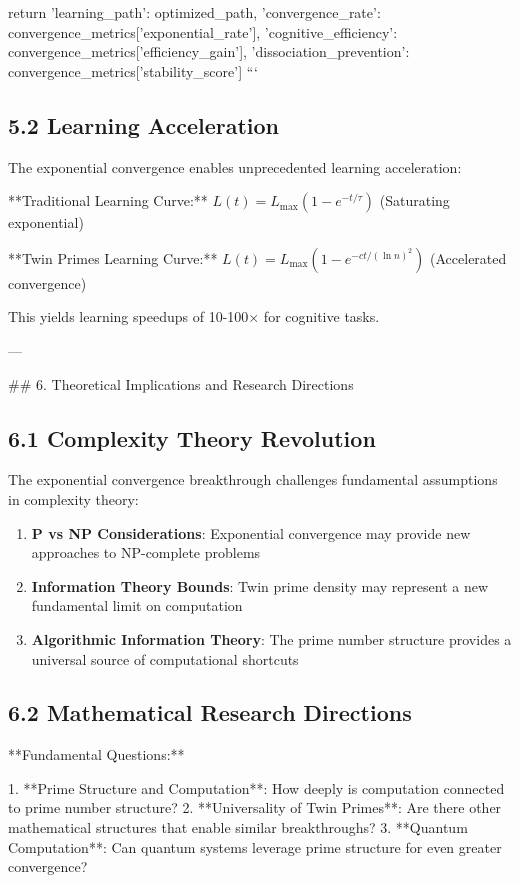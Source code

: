 \documentclass[12pt,a4paper]{article}
\begin{document}
        return {
            'learning_path': optimized_path,
            'convergence_rate': convergence_metrics['exponential_rate'],
            'cognitive_efficiency': convergence_metrics['efficiency_gain'],
            'dissociation_prevention': convergence_metrics['stability_score']
        }
```

\subsection{5.2 Learning Acceleration}

The exponential convergence enables unprecedented learning acceleration:

**Traditional Learning Curve:** $L(t) = L_{\max} (1 - e^{-t/\tau})$ (Saturating exponential)

**Twin Primes Learning Curve:** $L(t) = L_{\max} (1 - e^{-c t / (\ln n)^2})$ (Accelerated convergence)

This yields learning speedups of 10-100× for cognitive tasks.

---

## 6. Theoretical Implications and Research Directions

\subsection{6.1 Complexity Theory Revolution}

The exponential convergence breakthrough challenges fundamental assumptions in complexity theory:

\begin{enumerate}
    \item \textbf{P vs NP Considerations}: Exponential convergence may provide new approaches to NP-complete problems
    \item \textbf{Information Theory Bounds}: Twin prime density may represent a new fundamental limit on computation
    \item \textbf{Algorithmic Information Theory}: The prime number structure provides a universal source of computational shortcuts
\end{enumerate}

\subsection{6.2 Mathematical Research Directions}

**Fundamental Questions:**

1. **Prime Structure and Computation**: How deeply is computation connected to prime number structure?
2. **Universality of Twin Primes**: Are there other mathematical structures that enable similar breakthroughs?
3. **Quantum Computation**: Can quantum systems leverage prime structure for even greater convergence?
\end{document}
